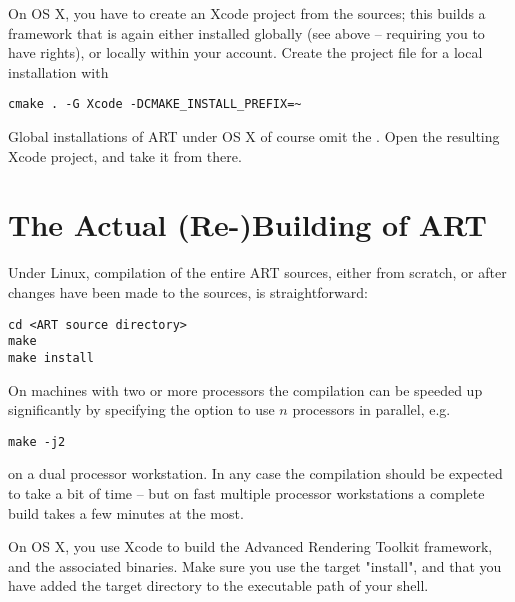 On OS X, you have to create an Xcode project from the sources; this builds a framework that is again either installed globally (see above -- requiring you to have  rights), or locally within your account. Create the project file for a local installation with

\begin{verbatim}
cmake . -G Xcode -DCMAKE_INSTALL_PREFIX=~
\end{verbatim}

Global installations of ART under OS X of course omit the . Open the resulting Xcode project, and take it from there.

\section{The Actual (Re-)Building of ART}
\label{sec:Installing:Building}
\label{sec:Installing:Building:Rebuilding}
Under Linux, compilation of the entire ART sources, either from scratch, or after changes have been made to the sources, is straightforward:
\begin{verbatim}
cd <ART source directory>
make
make install
\end{verbatim}
On machines with two or more processors the compilation can be speeded up
significantly by specifying the option  to use $n$ processors in
parallel, e.g.
\begin{verbatim}
make -j2 
\end{verbatim}
on a dual processor workstation. In any case the compilation should be expected to take a bit of time -- but on fast multiple processor workstations a complete build takes a few minutes at the most.

On OS X, you use Xcode to build the Advanced Rendering Toolkit framework, and the associated binaries. Make sure you use the target "install", and that you have added the target directory to the executable path of your shell.


